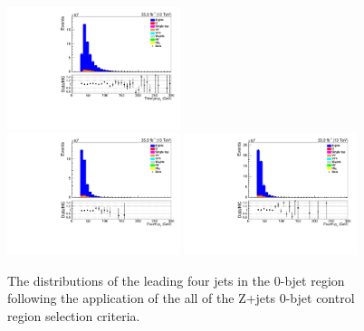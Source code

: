 \begin{figure}[!ht]
\includegraphics[width=0.45\textwidth]{figs/background-estimation/plots/unblinded/DY_control_old_prompt_mumu_DYamcatnlo/thirdJetPt_SingleTop_wMass_mumu.pdf}
\\
\includegraphics[width=0.45\textwidth]{figs/background-estimation/plots/unblinded/DY_control_old_prompt_ee_DYamcatnlo/fourthJetPt_SingleTop_wMass_ee.pdf}
\includegraphics[width=0.45\textwidth]{figs/background-estimation/plots/unblinded/DY_control_old_prompt_mumu_DYamcatnlo/fourthJetPt_SingleTop_wMass_mumu.pdf}
\caption{
The distributions of the leading four jets \pt in the 0-bjet region following the application of the all of the Z+jets 0-bjet control region selection criteria.
}
\label{fig:App_CR_NLO_jetPt_wMass}
\end{figure}

